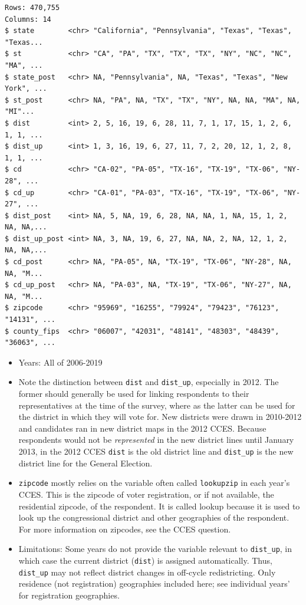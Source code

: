 \documentclass[10pt,article,oneside]{memoir}
\theoremstyle{definition}
\begin{document}
\begin{verbatim}
Rows: 470,755
Columns: 14
$ state        <chr> "California", "Pennsylvania", "Texas", "Texas", "Texas...
$ st           <chr> "CA", "PA", "TX", "TX", "TX", "NY", "NC", "NC", "MA", ...
$ state_post   <chr> NA, "Pennsylvania", NA, "Texas", "Texas", "New York", ...
$ st_post      <chr> NA, "PA", NA, "TX", "TX", "NY", NA, NA, "MA", NA, "MI"...
$ dist         <int> 2, 5, 16, 19, 6, 28, 11, 7, 1, 17, 15, 1, 2, 6, 1, 1, ...
$ dist_up      <int> 1, 3, 16, 19, 6, 27, 11, 7, 2, 20, 12, 1, 2, 8, 1, 1, ...
$ cd           <chr> "CA-02", "PA-05", "TX-16", "TX-19", "TX-06", "NY-28", ...
$ cd_up        <chr> "CA-01", "PA-03", "TX-16", "TX-19", "TX-06", "NY-27", ...
$ dist_post    <int> NA, 5, NA, 19, 6, 28, NA, NA, 1, NA, 15, 1, 2, NA, NA,...
$ dist_up_post <int> NA, 3, NA, 19, 6, 27, NA, NA, 2, NA, 12, 1, 2, NA, NA,...
$ cd_post      <chr> NA, "PA-05", NA, "TX-19", "TX-06", "NY-28", NA, NA, "M...
$ cd_up_post   <chr> NA, "PA-03", NA, "TX-19", "TX-06", "NY-27", NA, NA, "M...
$ zipcode      <chr> "95969", "16255", "79924", "79423", "76123", "14131", ...
$ county_fips  <chr> "06007", "42031", "48141", "48303", "48439", "36063", ...
\end{verbatim}

\begin{itemize}
\tightlist
\item
  Years: All of 2006-2019
\item
  Note the distinction between \texttt{dist} and \texttt{dist\_up},
  especially in 2012. The former should generally be used for linking
  respondents to their representatives at the time of the survey, where
  as the latter can be used for the district in which they will vote
  for. New districts were drawn in 2010-2012 and candidates ran in new
  district maps in the 2012 CCES. Because respondents would not be
  \emph{represented} in the new district lines until January 2013, in
  the 2012 CCES \texttt{dist} is the old district line and
  \texttt{dist\_up} is the new district line for the General Election.
\item
  \texttt{zipcode} mostly relies on the variable often called
  \texttt{lookupzip} in each year's CCES. This is the zipcode of voter
  registration, or if not available, the residential zipcode, of the
  respondent. It is called lookup because it is used to look up the
  congressional district and other geographies of the respondent. For
  more information on zipcodes, see the CCES question.
\item
  Limitations: Some years do not provide the variable relevant to
  \texttt{dist\_up}, in which case the current district (\texttt{dist})
  is assigned automatically. Thus, \texttt{dist\_up} may not reflect
  district changes in off-cycle redistricting. Only residence (not
  registration) geographies included here; see individual years' for
  registration geographies.
\end{itemize}
\end{document}
